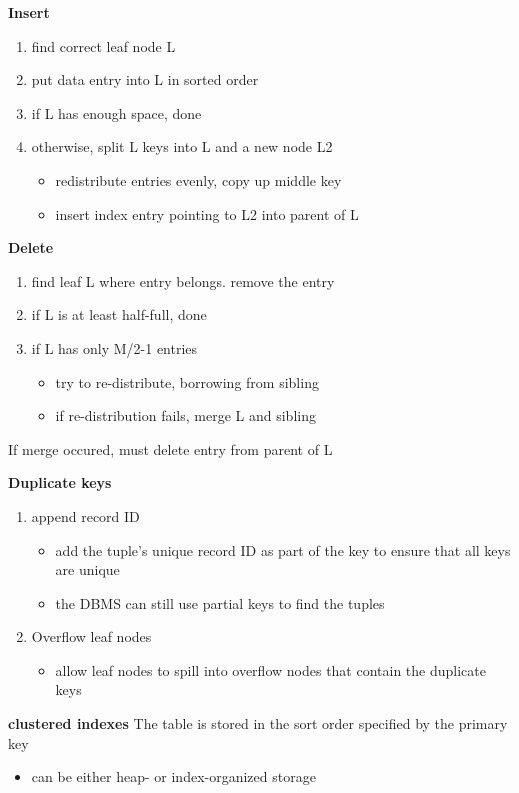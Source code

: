 \documentclass[11pt]{article}
\begin{document}
\textbf{Insert}
\begin{enumerate}
\item find correct leaf node L
\item put data entry into L in sorted order
\item if L has enough space, done
\item otherwise, split L keys into L and a new node L2
\begin{itemize}
\item redistribute entries evenly, copy up middle key
\item insert index entry pointing to L2 into parent of L
\end{itemize}
\end{enumerate}

\textbf{Delete}
\begin{enumerate}
\item find leaf L where entry belongs. remove the entry
\item if L is at least half-full, done
\item if L has only M/2-1 entries
\begin{itemize}
\item try to re-distribute, borrowing from sibling
\item if re-distribution fails, merge L and sibling
\end{itemize}
\end{enumerate}
If merge occured, must delete entry from parent of L

\textbf{Duplicate keys}
\begin{enumerate}
\item append record ID
\begin{itemize}
\item add the tuple's unique record ID as part of the key to ensure that all keys are unique
\item the DBMS can still use partial keys to find the tuples
\end{itemize}
\item Overflow leaf nodes
\begin{itemize}
\item allow leaf nodes to spill into overflow nodes that contain the duplicate keys
\end{itemize}
\end{enumerate}

\textbf{clustered indexes}
The table is stored in the sort order specified by the primary key
\begin{itemize}
\item can be either heap- or index-organized storage
\end{itemize}
\end{document}

